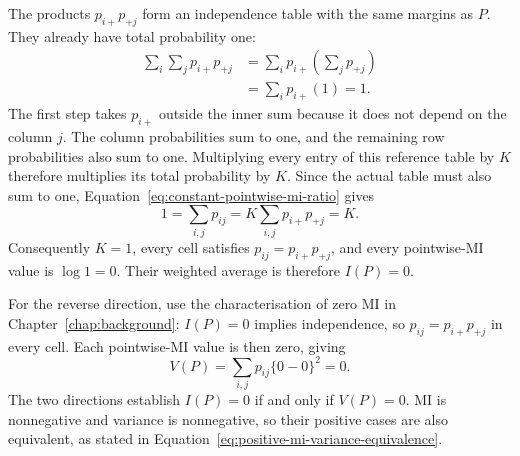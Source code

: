 The products \(p_{i+}p_{+j}\) form an independence table with the same
margins as \(P\). They already have total probability one:
\begin{align}
 \sum_i\sum_jp_{i+}p_{+j}
 &=\sum_i p_{i+}\left(\sum_jp_{+j}\right)\\
 &=\sum_i p_{i+}(1)=1.
\end{align}
The first step takes \(p_{i+}\) outside the inner sum because it does
not depend on the column \(j\). The column probabilities sum to one,
and the remaining row probabilities also sum to one. Multiplying every
entry of this reference table by \(K\) therefore multiplies its total
probability by \(K\). Since the actual table must also sum to one,
Equation~\eqref{eq:constant-pointwise-mi-ratio} gives
\begin{equation}
 1=\sum_{i,j}p_{ij}
  =K\sum_{i,j}p_{i+}p_{+j}=K.
\end{equation}
Consequently \(K=1\), every cell satisfies
\(p_{ij}=p_{i+}p_{+j}\), and every pointwise-MI value is \(\log1=0\).
Their weighted average is therefore \(I(P)=0\).

\medskip
{}

For the reverse direction, use the characterisation of zero MI in
Chapter~\ref{chap:background}: \(I(P)=0\) implies independence, so
\(p_{ij}=p_{i+}p_{+j}\) in every cell. Each pointwise-MI value is
then zero, giving
\begin{equation}
 V(P)=\sum_{i,j}p_{ij}\{0-0\}^2=0.
\end{equation}
The two directions establish \(I(P)=0\) if and only if \(V(P)=0\).
MI is nonnegative and variance is nonnegative, so their positive cases
are also equivalent, as stated in
Equation~\eqref{eq:positive-mi-variance-equivalence}.

\medskip
{}

